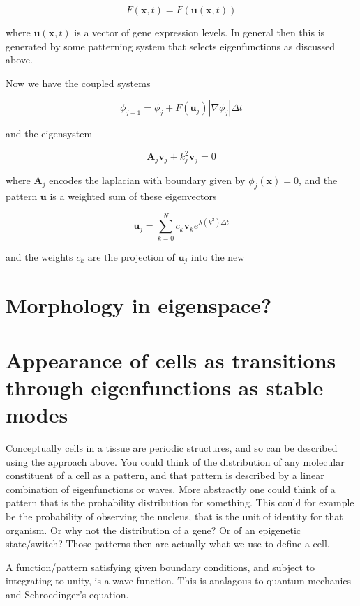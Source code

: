 \documentclass{report}
\renewcommand{\vec}[1]{\mathbf{#1}}
\newcommand{\mat}{\mathbf}
\begin{document}
\begin{equation}
F(\vec{x},t) = F(\vec{u}(\vec{x},t))
\end{equation}

where $\vec{u}(\vec{x},t)$ is a vector of gene expression levels. In general
then this is generated by some patterning system that selects eigenfunctions as
discussed above. 

Now we have the coupled systems

\begin{equation}
\phi_{j+1} = \phi_j + F(\vec{u}_j) \left|\nabla\phi_j\right| \Delta t 
\end{equation}

and the eigensystem

\begin{equation}
\mat{A}_j \vec{v}_j + k_j^2 \vec{v}_j = 0
\end{equation}

where $\mat{A}_j$ encodes the laplacian with boundary given by
$\phi_j(\vec{x})=0$, and the pattern $\vec{u}$ is a weighted sum of these
eigenvectors

\begin{equation}
\vec{u}_{j} = \sum_{k=0}^{N} c_k \vec{v}_k e^{\lambda(k^2) \Delta t}
\end{equation}

and the weights $c_k$ are the projection of $\vec{u}_j$ into the new 



\section{Morphology in eigenspace?}

\section{Appearance of cells as transitions through eigenfunctions as stable
modes}
Conceptually cells in a tissue are periodic structures, and so can be described
using the approach above. You could think of the distribution of any molecular
constituent of a cell as a pattern, and that pattern is described by a linear
combination of eigenfunctions or waves. More abstractly one could think of a
pattern that is the probability distribution for something. This could for
example be the probability of observing the nucleus, that is the unit of
identity for that organism. Or why not the distribution of a gene? Or of an
epigenetic state/switch? Those patterns then are actually what we use to define
a cell.

A function/pattern satisfying given boundary conditions, and subject to
integrating to unity, is a wave function. This is analagous to quantum mechanics
and Schroedinger's equation. 

\section{}
\end{document}

